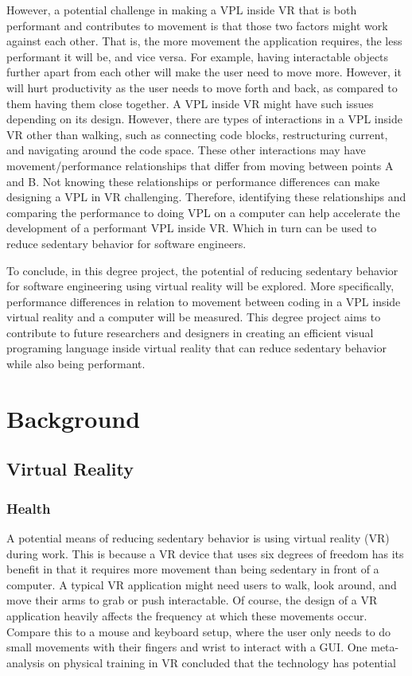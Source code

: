 \documentclass[screen, sigcconf]{timtm}
\begin{document}
However, a potential challenge in making a VPL inside VR that is both performant and contributes to movement is that those two factors might work against each other. That is, the more movement the application requires, the less performant it will be, and vice versa. For example, having interactable objects further apart from each other will make the user need to move more. However, it will hurt productivity as the user needs to move forth and back, as compared to them having them close together. A VPL inside VR might have such issues depending on its design. However, there are types of interactions in a VPL inside VR other than walking, such as connecting code blocks, restructuring current, and navigating around the code space. These other interactions may have movement/performance relationships that differ from moving between points A and B. Not knowing these relationships or performance differences can make designing a VPL in VR challenging. Therefore, identifying these relationships and comparing the performance to doing VPL on a computer can help accelerate the development of a performant VPL inside VR. Which in turn can be used to reduce sedentary behavior for software engineers.

To conclude, in this degree project, the potential of reducing sedentary behavior for software engineering using virtual reality will be explored. More specifically, performance differences in relation to movement between coding in a VPL inside virtual reality and a computer will be measured. This degree project aims to contribute to future researchers and designers in creating an efficient visual programing language inside virtual reality that can reduce sedentary behavior while also being performant.

\section{Background}

\subsection{Virtual Reality}

\subsubsection{Health}
A potential means of reducing sedentary behavior is using virtual reality (VR) during work. This is because a VR device that uses six degrees of freedom has its benefit in that it requires more movement than being sedentary in front of a computer. A typical VR application might need users to walk, look around, and move their arms to grab or push interactable. Of course, the design of a VR application heavily affects the frequency at which these movements occur. Compare this to a mouse and keyboard setup, where the user only needs to do small movements with their fingers and wrist to interact with a GUI. One meta-analysis on physical training in VR concluded that the technology has potential \cite{ng_effectiveness_2019}
\end{document}
